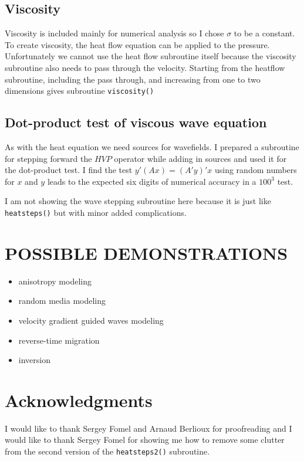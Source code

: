 \subsection{Viscosity}
Viscosity is included mainly for numerical analysis
so I chose $\sigma$ to be a constant.
To create viscosity, the heat flow equation can be applied to the pressure.
Unfortunately we cannot use the heat flow subroutine itself
because the viscosity subroutine also needs to pass through the velocity.
Starting from the heatflow subroutine,
including the pass through,
and increasing from
one to two dimensions
gives subroutine {\tt viscosity()}



\subsection{Dot-product test of viscous wave equation}
\par
As with the heat equation we need sources for wavefields.
I prepared a
subroutine for stepping forward
the $HVP$ operator while adding in sources
and used it for the dot-product test.
I find the test $y'(Ax)=(A'y)'x$
using random numbers for $x$ and $y$
leads to the expected six digits of numerical accuracy
in a $100^3$ test.

\par
I am not showing the wave stepping subroutine here because
it is just like {\tt heatsteps()} but with minor added complications.



\section{POSSIBLE DEMONSTRATIONS}

\begin{itemize}
\item anisotropy modeling
\item random media modeling
\item velocity gradient guided waves modeling
\item reverse-time migration
\item inversion
\end{itemize}

\section{Acknowledgments}
I would like to thank Sergey Fomel and Arnaud Berlioux for proofreading
and I would like to thank Sergey Fomel
for showing me how to remove some clutter from the second version
of the {\tt heatsteps2()} subroutine.



